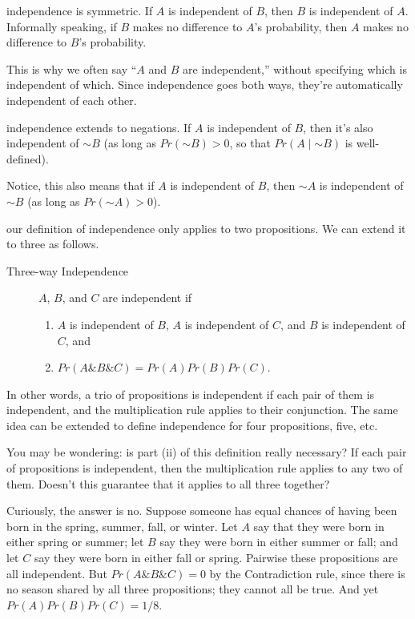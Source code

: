 \documentclass[justified]{tufte-book}
\providecommand{\tightlist}{%
  \setlength{\itemsep}{0pt}\setlength{\parskip}{0pt}}
\newcommand{\given}{\mid}
\renewcommand{\neg}{\mathbin{\sim}}
\renewcommand{\wedge}{\mathbin{\&}}
\newcommand{\p}{Pr}
\theoremstyle{definition}
\theoremstyle{definition}
\theoremstyle{definition}
\theoremstyle{definition}
\theoremstyle{remark}
\begin{document}
 independence is symmetric. If \(A\) is independent of \(B\), then \(B\) is independent of \(A\). Informally speaking, if \(B\) makes no difference to \(A\)'s probability, then \(A\) makes no difference to \(B\)'s probability.

This is why we often say ``\(A\) and \(B\) are independent,'' without specifying which is independent of which. Since independence goes both ways, they're automatically independent of each other.

 independence extends to negations. If \(A\) is independent of \(B\), then it's also independent of \(\neg B\) (as long as \(\p(\neg B) > 0\), so that \(\p(A \given \neg B)\) is well-defined).

Notice, this also means that if \(A\) is independent of \(B\), then \(\neg A\) is independent of \(\neg B\) (as long as \(\p(\neg A) > 0\)).

 our definition of independence only applies to two propositions. We can extend it to three as follows.

\begin{description}
\item[Three-way Independence]
\(A\), \(B\), and \(C\) are independent if

\begin{enumerate}
\def\labelenumi{\roman{enumi}.}
\tightlist
\item
  \(A\) is independent of \(B\), \(A\) is independent of \(C\), and \(B\) is independent of \(C\), and
\item
  \(\p(A \wedge B \wedge C) = \p(A)\p(B)\p(C)\).
\end{enumerate}
\end{description}

In other words, a trio of propositions is independent if each pair of them is independent, and the multiplication rule applies to their conjunction. The same idea can be extended to define independence for four propositions, five, etc.

You may be wondering: is part (ii) of this definition really necessary? If each pair of propositions is independent, then the multiplication rule applies to any two of them. Doesn't this guarantee that it applies to all three together?

Curiously, the answer is no. Suppose someone has equal chances of having been born in the spring, summer, fall, or winter. Let \(A\) say that they were born in either spring or summer; let \(B\) say they were born in either summer or fall; and let \(C\) say they were born in either fall or spring. Pairwise these propositions are all independent. But \(\p(A \wedge B \wedge C) = 0\) by the Contradiction rule, since there is no season shared by all three propositions; they cannot all be true. And yet \(\p(A)\p(B)\p(C) = 1/8\).
\end{document}
